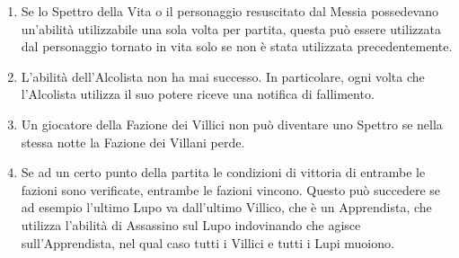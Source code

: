 \documentclass[a4paper,10pt]{article}
\begin{document}
\begin{enumerate}
	\item Se lo Spettro della Vita o il personaggio resuscitato dal Messia possedevano un'abilità utilizzabile una sola volta per partita, questa può essere utilizzata dal personaggio tornato in vita solo se non è stata utilizzata precedentemente.
	
	
	
	\item L'abilità dell'Alcolista non ha mai successo. In particolare, ogni volta che l'Alcolista utilizza il suo potere riceve una notifica di fallimento.
	
	\item Un giocatore della Fazione dei Villici non può diventare uno Spettro se nella stessa notte la Fazione dei Villani perde.
	
	\item Se ad un certo punto della partita le condizioni di vittoria di entrambe le fazioni sono verificate, entrambe le fazioni vincono. Questo può succedere se ad esempio l'ultimo Lupo va dall'ultimo Villico, che è un Apprendista, che utilizza l'abilità di Assassino sul Lupo indovinando che agisce sull'Apprendista, nel qual caso tutti i Villici e tutti i Lupi muoiono.
	
	
	


\end{enumerate}
\end{document}

